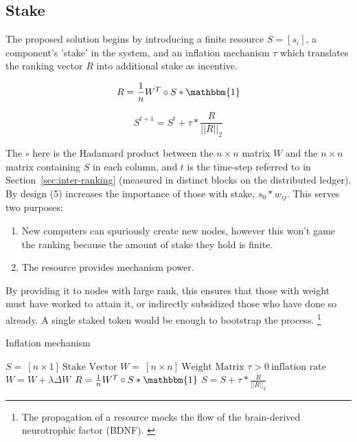 \documentclass{article}
\begin{document}
\subsection{Stake}
\label{sec:stake}
The proposed solution begins by introducing a finite resource $ S=[s_i]$, a component's 'stake' in the system, and an inflation mechanism $\tau$ which translates the ranking vector $R$ into additional stake as incentive. 
\bigskip

\begin{equation}
R = \frac{1}{n} W^T \circ S * \mathbbm{1}
\end{equation}

\begin{equation}
S^{t+1} = S^t + \tau * \frac{R}{||R||_2} 
\end{equation}

The $\circ$ here is the Hadamard product between the $n \times n$ matrix $W$ and the $n \times n$ matrix containing $S$ in each column, and $t$ is the time-step referred to in Section~\ref{sec:inter-ranking} (measured in distinct blocks on the distributed ledger). By design (5) increases the importance of those with stake, $s_0 * w_{ij}$. This serves two purposes: 

\begin{enumerate}
	\item New computers can spuriously create new nodes, however this won't game the ranking because the amount of stake they hold is finite.
	\item The resource provides mechanism power.
\end{enumerate}

By providing it to nodes with large rank, this ensures that those with weight must have worked to attain it, or indirectly subsidized those who have done so already. A single staked token would be enough to bootstrap the process. \footnote{The propagation of a resource mocks the flow of the brain-derived neurotrophic factor (BDNF). \cite{Bathina1989neurotrophin}} 
\smallskip

\begin{algorithm}
	\caption{Inflation mechanism}
	\begin{algorithmic} 
		
		\REQUIRE $S = \ [n \times 1] \ \textrm{Stake Vector}$
		\REQUIRE $W = \ [n \times n] \ \textrm{Weight Matrix}$
		\REQUIRE $\tau > 0 \ \textrm{inflation rate}$
		\STATE $W = W + \lambda \Delta W$
		\STATE $R = \frac{1}{n} W^T \circ S * \mathbbm{1}$
		\STATE $S = S + \tau * \frac{R}{||R||_2}  $
		\ENDWHILE
	\end{algorithmic}
\end{algorithm}
\smallskip
\end{document}
